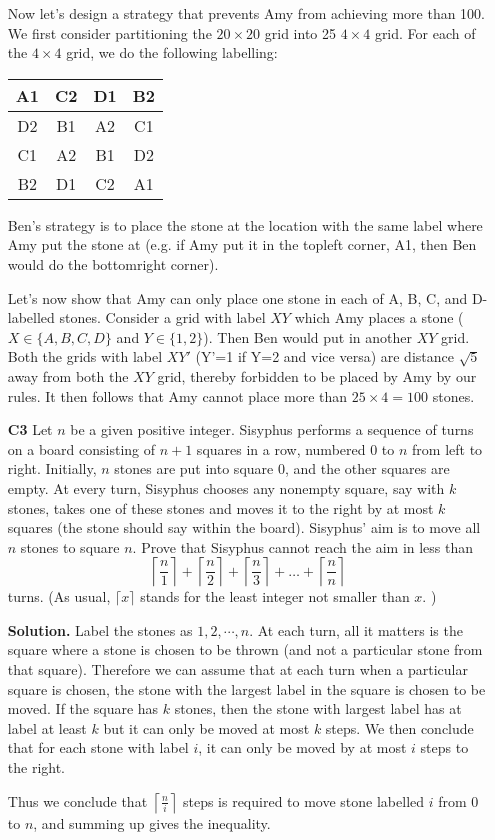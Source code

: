 \documentclass[11pt,a4paper]{article}
\begin{document}
\begin{enumerate}
	Now let's design a strategy that prevents Amy from achieving more than 100. 
	We first consider partitioning the $20\times 20$ grid into 25 $4\times 4$ grid. 
	For each of the $4\times 4$ grid, we do the following labelling: 
	\begin{table}[H]
		\centering
		\begin{tabular}{|c|c|c|c|}
			\hline
			A1 & C2 & D1 & B2\\
			\hline
			D2 & B1 & A2 & C1\\
			\hline
			C1 & A2 & B1 & D2\\
			\hline
			B2 & D1 & C2 & A1\\
			\hline
		\end{tabular}
	\end{table}
    Ben's strategy is to place the stone at the location with the same label where Amy put the stone at (e.g. if Amy put it in the topleft corner, A1, then Ben would do the bottomright corner). 
    
    Let's now show that Amy can only place one stone in each of A, B, C, and D-labelled stones. 
    Consider a grid with label $XY$ which Amy places a stone ($X\in \{A, B, C, D\}$ and $Y\in \{1, 2\}$). 
    Then Ben would put in another $XY$ grid. 
    Both the grids with label $XY'$ (Y'=1 if Y=2 and vice versa) are distance $\sqrt{5}$ away from both the $XY$ grid, 
    thereby forbidden to be placed by Amy by our rules. 
    It then follows that Amy cannot place more than $25\times 4=100$ stones. 
	
	\item[\textbf{C3}]Let $n$ be a given positive integer. Sisyphus performs a sequence of turns on a board consisting of $n + 1$ squares in a row, numbered $0$ to $n$ from left to right. Initially, $n$ stones are put into square $0$, and the other squares are empty. At every turn, Sisyphus chooses any nonempty square, say with $k$ stones, takes one of these stones and moves it to the right by at most $k$ squares (the stone should say within the board). Sisyphus' aim is to move all $n$ stones to square $n$.
	Prove that Sisyphus cannot reach the aim in less than
	\[ \left \lceil \frac{n}{1} \right \rceil + \left \lceil \frac{n}{2} \right \rceil + \left \lceil \frac{n}{3} \right \rceil + \dots + \left \lceil \frac{n}{n} \right \rceil \]turns. (As usual, $\lceil x \rceil$ stands for the least integer not smaller than $x$. )
	
	\textbf{Solution.} Label the stones as $1, 2, \cdots , n$. At each turn, all it matters is the square where a stone is chosen to be thrown (and not a particular stone from that square). 
	Therefore we can assume that at each turn when a particular square is chosen, the stone with the largest label in the square is chosen to be moved. If the square has $k$ stones, then the stone with largest label has at label at least $k$ but it can only be moved at most $k$ steps. We then conclude that for each stone with label $i$, it can only be moved by at most $i$ steps to the right. 
	
	Thus we conclude that $ \left \lceil \frac{n}{i} \right \rceil$ steps is required to move stone labelled $i$ from 0 to $n$, and summing up gives the inequality. 
\end{enumerate}
\end{document}
